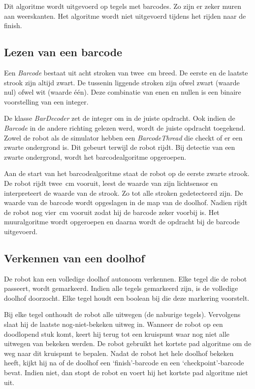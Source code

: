 \documentclass[tt3]{penoverslag}
\begin{document}
Dit algoritme wordt uitgevoerd op tegels met barcodes. Zo zijn er zeker muren aan weerskanten. Het algoritme wordt niet uitgevoerd tijdens het rijden naar de finish.

\subsection{Lezen van een barcode} %
\label{ssec:algoBarcode}
Een \textit{Barcode} bestaat uit acht stroken van twee~cm breed. De eerste en de laatste strook zijn altijd zwart. De tussenin liggende stroken zijn ofwel zwart (waarde nul) ofwel wit (waarde \'e\'en). Deze combinatie van enen en nullen is een binaire voorstelling van een integer.

De klasse \textit{BarDecoder} zet de integer om in de juiste opdracht. Ook indien de \textit{Barcode} in de andere richting gelezen werd, wordt de juiste opdracht toegekend.\\

Zowel de robot als de simulator hebben een \textit{BarcodeThread} die checkt of er een zwarte ondergrond is. Dit gebeurt terwijl de robot rijdt. Bij detectie van een zwarte ondergrond, wordt het barcodealgoritme opgeroepen.

Aan de start van het barcodealgoritme staat de robot op de eerste zwarte strook. De robot rijdt twee~cm vooruit, leest de waarde van zijn lichtsensor en interpreteert de waarde van de strook. Zo tot alle stroken gedetecteerd zijn. De waarde van de barcode wordt opgeslagen in de map van de doolhof. Nadien rijdt de robot nog vier~cm vooruit zodat hij de barcode zeker voorbij is. Het muuralgoritme wordt opgeroepen en daarna wordt de opdracht bij de barcode uitgevoerd.


\subsection{Verkennen van een doolhof} %
\label{ssec:algoOnderzDoolhof}

De robot kan een volledige doolhof autonoom verkennen. Elke tegel die de robot passeert, wordt gemarkeerd. Indien alle tegels gemarkeerd zijn, is de volledige doolhof doorzocht. Elke tegel houdt een boolean bij die deze markering voorstelt.

Bij elke tegel onthoudt de robot alle uitwegen (de naburige tegels). Vervolgens slaat hij de laatste nog-niet-bekeken uitweg in. Wanneer de robot op een doodlopend stuk komt, keert hij terug tot een kruispunt waar nog niet alle uitwegen van bekeken werden. De robot gebruikt het kortste pad algoritme om de weg naar dit kruispunt te bepalen.
Nadat de robot het hele doolhof bekeken heeft, kijkt hij na of de doolhof een `finish'-barcode en een `checkpoint'-barcode bevat. Indien niet, dan stopt de robot en voert hij het kortste pad algoritme niet uit.\\
\end{document}
